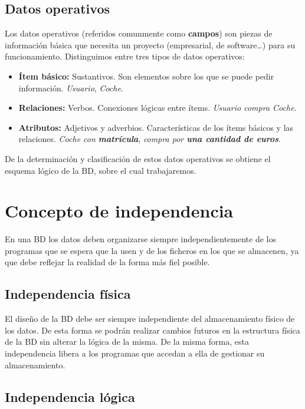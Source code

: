 \subsection{Datos operativos}

Los datos operativos (referidos comunmente como \textbf{campos}) son piezas de información básica que necesita un proyecto (empresarial, de software\ldots) para su funcionamiento.
Distinguimos entre tres tipos de datos operativos:

\begin{itemize}
	\item\textbf{Ítem básico:} Sustantivos. Son elementos sobre los que se puede pedir información. \textit{Usuario}, \textit{Coche}.
	\item\textbf{Relaciones:} Verbos. Conexiones lógicas entre ítems. \textit{Usuario compra Coche}.
	\item\textbf{Atributos:} Adjetivos y adverbios. Características de los ítems básicos y las relaciones. \textit{Coche con \textbf{matrícula}}, \textit{compra por \textbf{una cantidad de euros}}.
\end{itemize}

De la determinación y clasificación de estos datos operativos se obtiene el esquema lógico de la BD, sobre el cual trabajaremos.

\section{Concepto de independencia}

En una BD los datos deben organizarse siempre independientemente de los programas que se espera que la usen y de los ficheros en los que se almacenen, ya que debe reflejar la realidad de la forma más fiel posible.

\subsection{Independencia física}

El diseño de la BD debe ser siempre independiente del almacenamiento físico de los datos.
De esta forma se podrán realizar cambios futuros en la estructura física de la BD sin alterar la lógica de la misma.
De la misma forma, esta independencia libera a los programas que accedan a ella de gestionar su almacenamiento.

\subsection{Independencia lógica}

